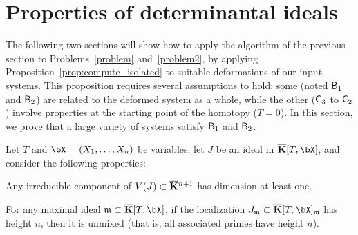 \documentclass[12pt]{article}
\begin{document}
 


\section{Properties of determinantal ideals}\label{sec:check}

The following two sections will show how to apply the algorithm of the
previous section to Problems~\ref{problem} and~\ref{problem2}, by
applying Proposition~\ref{prop:compute_isolated} to suitable
deformations of our input systems. This proposition requires several
assumptions to hold: some (noted $\mathsf{B}_1$ and $\mathsf{B}_2$) are related
to the deformed system as a whole, while the other ($\mathsf{C}_3$ to
$\mathsf{C}_2$) involve properties at the starting point of the homotopy
($T=0$). In this section, we prove that a large variety of systems
satisfy $\mathsf{B}_1$ and $\mathsf{B}_2$.

Let $T$ and $\bX=(X_1,\dots,X_n)$ be variables, let $J$ be an ideal in
$\KKbar[T,\bX]$, and consider the following properties:
\begin{description}[leftmargin=*]
\item[$\assA_1.$] Any irreducible component of $V(J) \subset
  \overline{\mathbf{K}}{}^{n+1}$ has dimension at least one.
\item[$\assA_2.$] For any maximal ideal $\m \subset\KKbar[T,\bX]$,
  if the localization $J_\m \subset \KKbar[T,\bX]_\m$ has height $n$,
  then it is unmixed (that is, all associated primes have height $n$).
\end{description}
\end{document}
